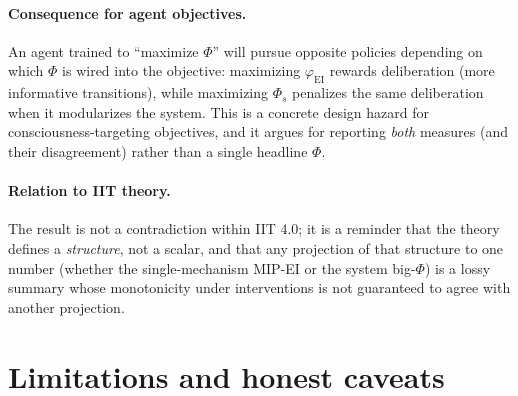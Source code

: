 \documentclass[11pt,a4paper]{article}
\newcommand{\faithful}{\ensuremath{\varphi_{\mathrm{EI}}}}
\newcommand{\bigphi}{\ensuremath{\Phi_{s}}}
\begin{document}
\paragraph{Consequence for agent objectives.} An agent trained to ``maximize
$\Phi$'' will pursue opposite policies depending on which $\Phi$ is wired into
the objective: maximizing \faithful{} rewards deliberation (more informative
transitions), while maximizing \bigphi{} penalizes the same deliberation when
it modularizes the system. This is a concrete design hazard for
consciousness-targeting objectives, and it argues for reporting \emph{both}
measures (and their disagreement) rather than a single headline $\Phi$.

\paragraph{Relation to IIT theory.} The result is not a contradiction within
IIT 4.0; it is a reminder that the theory defines a \emph{structure}, not a
scalar, and that any projection of that structure to one number (whether the
single-mechanism MIP-EI or the system big-$\Phi$) is a lossy summary whose
monotonicity under interventions is not guaranteed to agree with another
projection.

\section{Limitations and honest caveats}
\label{sec:limits}
\end{document}
